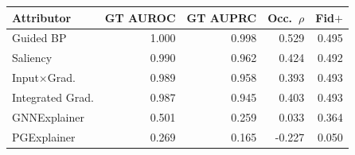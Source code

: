 \setlength{\tabcolsep}{3.6pt}
\begin{tabular}{lrrrr}
\toprule
Attributor & GT AUROC & GT AUPRC & Occ.\ $\rho$ & Fid$+$ \\
\midrule
Guided BP & 1.000 & 0.998 & 0.529 & 0.495 \\
Saliency & 0.990 & 0.962 & 0.424 & 0.492 \\
Input$\times$Grad. & 0.989 & 0.958 & 0.393 & 0.493 \\
Integrated Grad. & 0.987 & 0.945 & 0.403 & 0.493 \\
GNNExplainer & 0.501 & 0.259 & 0.033 & 0.364 \\
PGExplainer & 0.269 & 0.165 & -0.227 & 0.050 \\
\bottomrule
\end{tabular}
